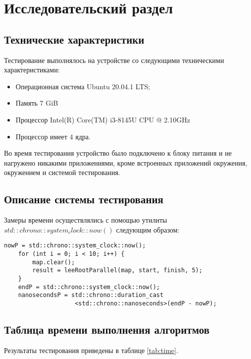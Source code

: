\chapter{Исследовательский раздел}\label{sec:exp}

\section{Технические характеристики}

Тестирование выполнялось на устройстве со следующими техническими характеристиками:
\begin{itemize}
	\item Операционная система Ubuntu 20.04.1 LTS;
	\item Память 7 GiB
	\item Процессор Intel(R) Core(TM) i3-8145U CPU @ 2.10GHz \cite{intel}
	\item Процессор имеет 4 ядра.
\end{itemize}
Во время тестирования устройство было подключено к блоку питания и не нагружено никакими приложениями, кроме встроенных приложений окружения, окружением и системой тестирования.

\section{Описание системы тестирования}
Замеры времени осуществлялись с помощью утилиты $std::chrono::system_clock::now()$ следующим образом:
\captionsetup{singlelinecheck = false, justification=raggedright}
\begin{lstlisting}[label=time,caption=Замеры времени]
    nowP = std::chrono::system_clock::now();
	for (int i = 0; i < 10; i++) {
		map.clear();
		result = leeRootParallel(map, start, finish, 5);
	}
	endP = std::chrono::system_clock::now();
	nanosecondsP = std::chrono::duration_cast
					<std::chrono::nanoseconds>(endP - nowP);
\end{lstlisting}
\section{Таблица времени выполнения алгоритмов}
\captionsetup{singlelinecheck = false, justification=raggedleft}

Результаты тестирования приведены в таблице \ref{tab:time}. 


